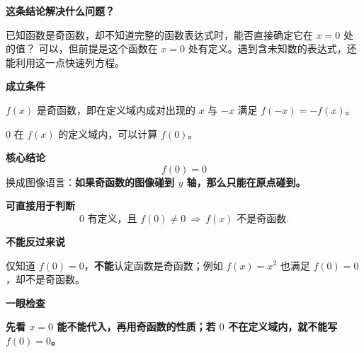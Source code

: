 \begin{statementbox}


  \textbf{\textcolor{CStatement}{这条结论解决什么问题？}}

  已知函数是奇函数，却不知道完整的函数表达式时，能否直接确定它在 $x=0$ 处的值？
  可以，但前提是这个函数在 $x=0$ 处有定义。遇到含未知数的表达式，还能利用这一点快速列方程。

  \medskip
  \textbf{\textcolor{CStatement}{成立条件}}
  \begin{description}[style=nextline, leftmargin=2.8em, labelsep=0.5em, itemsep=0.35em]
    \item[\textbf{条件一：}] $f(x)$ 是奇函数，即在定义域内成对出现的 $x$ 与 $-x$ 满足 $f(-x)=-f(x)$。
    \item[\textbf{条件二：}] $0$ 在 $f(x)$ 的定义域内，可以计算 $f(0)$。
  \end{description}

  \medskip
  \textbf{\textcolor{CStatement}{核心结论}}
  \[
    \boxed{f(0)=0}
  \]
  换成图像语言：\textbf{如果奇函数的图像碰到 $y$ 轴，那么只能在原点碰到。}

  \medskip
  \end{statementbox}
\clearpage
\begin{statementbox}
\textbf{\textcolor{CStatement}{可直接用于判断}}
  \[
    \boxed{0\text{ 有定义，且 }f(0)\ne0
    \ \Longrightarrow\ f(x)\text{ 不是奇函数}.}
  \]

  \medskip
  \textbf{\textcolor{CStatement}{不能反过来说}}



  仅知道 $f(0)=0$，\textbf{不能}认定函数是奇函数；例如 $f(x)=x^2$ 也满足 $f(0)=0$，却不是奇函数。

  \medskip
  \textbf{\textcolor{CStatement}{一眼检查}}

  \textbf{先看 $x=0$ 能不能代入，再用奇函数的性质；若 $0$ 不在定义域内，就不能写 $f(0)=0$。}
\end{statementbox}

